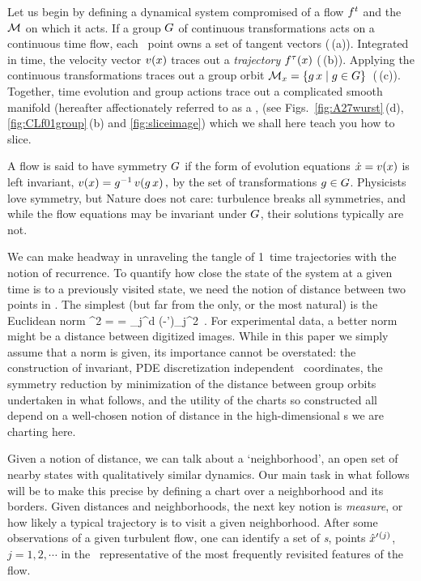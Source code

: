 \documentclass[aip,cha,reprint,
secnumarabic,
nofootinbib, tightenlines,
nobibnotes, showkeys, showpacs,
groupedaddress
]{revtex4-1}
\begin{document}
Let us begin by defining a {dynamical system} compromised of a flow
$f^t$ and the \statesp\ ${\cal M}$ on which it acts. If a group $G$ of
continuous transformations acts on a continuous time flow, each \statesp\
point owns a set of tangent vectors (\,(a)).
Integrated in time, the velocity vector $v(x)$ traces out a {\em
trajectory} ${f^{\tau}(x)}$ (\reffig{fig:A27wurst}\,(b)). Applying
the continuous transformations traces out a {group orbit}
\(
{\cal M}_{x} = \{g\,x \mid g \in {\ensuremath{G}}\}
\,
\) %
(\,(c)). Together, time evolution and group actions
trace out a complicated smooth manifold (hereafter affectionately
referred to as a {\em \wurst}, (see Figs.~\ref{fig:A27wurst}\,(d),
\ref{fig:CLf01group}\,(b) and \ref{fig:sliceimage}) which we shall here
teach you how to slice.

A flow is said to have symmetry $G$ if the form of evolution
equations $\dot{x} = v(x)$ is left invariant,
\(
v(x)=g^{-1} \, v(g \, x)
\,,
\) %
by the set of transformations $g \in {\ensuremath{G}}$. Physicists love
symmetry,\rf{Kerswell12} but Nature does not care: turbulence breaks all
symmetries, and while the flow equations may be invariant under $G$,
their solutions typically are not.

We can make headway in unraveling the tangle
of 1\dmn\ time trajectories with the notion of recurrence. To quantify how
close the state of the system at a given time is to a previously
visited state, we need the notion of distance between two points in
\statesp. The simplest (but far from the only, or the most natural) is
the Euclidean norm
\beq
  ^2  =  =
\sum_j^d
(\ssp-\ssp')_j^2
\,.
For experimental data, a better norm might be a distance between digitized
images. While in this paper we simply assume that a norm is given, its
importance cannot be overstated: the construction of invariant, PDE
discretization independent \statesp\ coordinates,\rf{GHCW07} the symmetry
reduction by minimization of the distance between group orbits undertaken
in what follows, and the utility of the charts so constructed all depend on a
well-chosen notion of distance in the high-dimensional \statesp s we are
charting here.

Given a notion of distance, we can talk about a `neighborhood', an open
set of nearby states with qualitatively similar dynamics. Our main task
in what follows will be to make this precise by defining a chart over a
neighborhood and its borders. Given distances and neighborhoods, the next
key notion is  \emph{measure}, or how likely a typical trajectory is to
visit a given neighborhood. After some observations of a given turbulent
flow, one can identify a set of \emph{\template
s}, {points} ${\hat{x}'}{}^{(j)}$,
$j=1,2,\cdots$ in the \statesp\ representative of the most frequently
revisited features of the flow.
\end{document}
